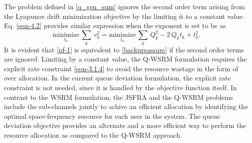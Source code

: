 
The problem defined in \eqref{q_gen_sum} ignores the second order term arising from the Lyapunov drift minimization objective by the limiting it to a constant value. Eq. \eqref{eqn-4.2} provides similar expression when the exponent is set to be  as
\begin{equation}\label{pf-1}
\underset{t_k}{\text{minimize}} \, \sum_k \, v_k^2 = \underset{t_k}{\text{minimize}} \, \sum_k \, Q_k^2 - 2 \, Q_k t_k + t_k^2.
\end{equation}
It is evident that \eqref{pf-1} is equivalent to \eqref{backpreassure} if the second order terms are ignored. Limiting  by a constant value, the \ac{Q-WSRM} formulation requires the explicit rate constraint \eqref{eqn-3.1.4} to avoid the resource wastage in the form of over allocation. In the current queue deviation formulation, the explicit rate constraint is not needed, since it is handled by the objective function itself. In contrast to the \ac{WSRM} formulation, the \ac{JSFRA} and the \ac{Q-WSRM} problems include the sub-channels jointly to achive an efficient allocation by identifying the optimal space-frequency resource for each user in the system. The queue deviation objective provides an alternate and a more efficient way to perform the resource allocation as compared to the \ac{Q-WSRM} approach.


